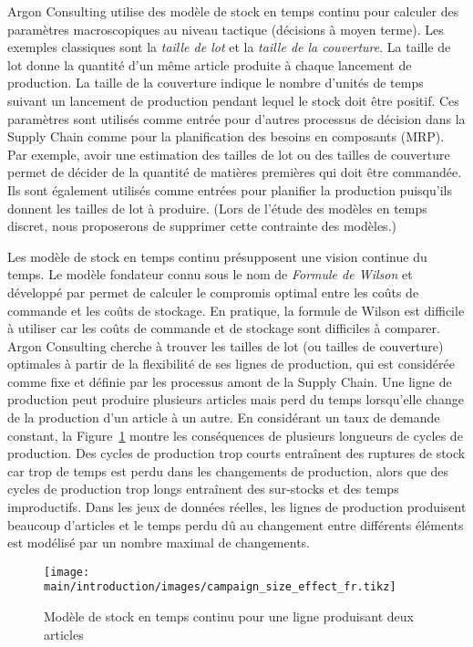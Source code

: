 Argon Consulting utilise des modèle de stock en temps continu pour calculer des paramètres macroscopiques au niveau tactique (décisions à moyen terme).
Les exemples classiques sont la \emph{taille de lot} et la \emph{taille de la couverture}.
La taille de lot donne la quantité d'un même article produite à chaque lancement de production.
La taille de la couverture indique le nombre d'unités de temps suivant un lancement de production pendant lequel le stock doit être positif.
Ces paramètres sont utilisés comme entrée pour d'autres processus de décision dans la Supply Chain comme pour la planification des besoins en composants (MRP).
Par exemple, avoir une estimation des tailles de lot ou des tailles de couverture permet de décider de la quantité de matières premières qui doit être commandée.
Ils sont également utilisés comme entrées pour planifier la production puisqu'ils donnent les tailles de lot à produire.
(Lors de l'étude des modèles en temps discret, nous proposerons de supprimer cette contrainte des modèles.)


Les modèle de stock en temps continu présupposent une vision continue du temps.
Le modèle fondateur connu sous le nom de \emph{Formule de Wilson} et développé par \citet{Harris1913} permet de calculer le compromis optimal entre les coûts de commande et les coûts de stockage.
En pratique, la formule de Wilson est difficile à utiliser car les coûts de commande et de stockage sont difficiles à comparer.
Argon Consulting cherche à trouver les tailles de lot (ou tailles de couverture) optimales à partir de la flexibilité de ses lignes de production, qui est considérée comme fixe et définie par les processus amont de la Supply Chain.
Une ligne de production peut produire plusieurs articles mais perd du temps lorsqu'elle change de la production d'un article à un autre.
En considérant un taux de demande constant, la Figure~\ref{fig:intro:fr:continuous-time-inventory-model} montre les conséquences de plusieurs longueurs de cycles de production.
Des cycles de production trop courts entraînent des ruptures de stock car trop de temps est perdu dans les changements de production, alors que des cycles de production trop longs entraînent des sur-stocks et des temps improductifs.
Dans les jeux de données réelles, les lignes de production produisent beaucoup d'articles et le temps perdu dû au changement entre différents éléments est modélisé par un nombre maximal de changements.


\begin{figure}[!ht]
  \centering
  \texttt{[image: main/introduction/images/campaign\_size\_effect\_fr.tikz]}
  \caption{Modèle de stock en temps continu pour une ligne produisant deux articles}
  \label{fig:intro:fr:continuous-time-inventory-model}
\end{figure}


